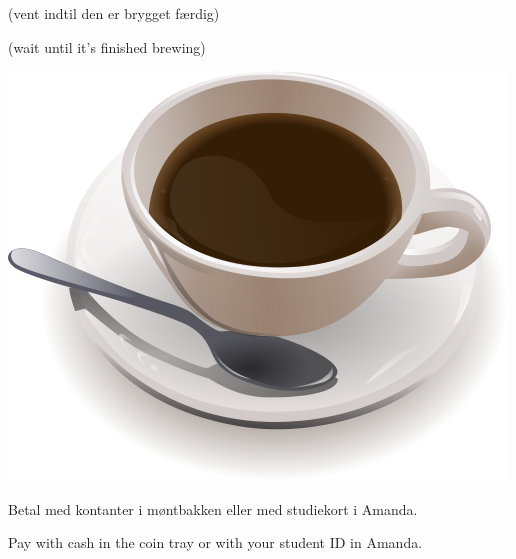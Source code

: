 \documentclass{article}
\begin{document}
\maketitle

\null
\vspace{-1cm}

\begin{center}

\vspace{-0.7cm}


\vspace{-0.5cm}

(vent indtil den er brygget færdig)

\english

\vspace{-0.7cm}


\vspace{-0.8cm}

(wait until it's finished brewing)

\vspace{1.7cm}

\includegraphics[scale=0.5]{billeder/500pxCoffeeWikiCommons.png}

\end{center}

\dansk

\vspace{0.3cm}

\begin{center}
\Large\bf

Betal med kontanter i møntbakken eller med studiekort i Amanda.

{\english Pay with cash in the coin tray or with your student ID in Amanda.}

\end{center}

\dansk

\underskriv
\end{document}

